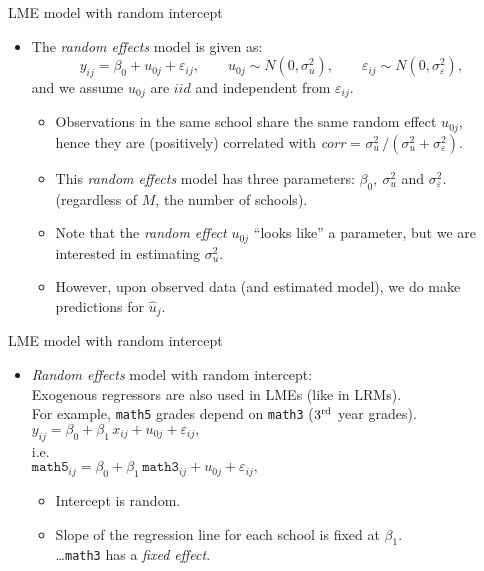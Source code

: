 \documentclass{beamer}
\begin{document}
\begin{frame}{LME model with random intercept}
\begin{itemize}
\item The \textit{random effects} model is given as:
$$ y_{ij} = \beta_{0} + u_{0j} + \varepsilon_{ij}, \qquad u_{0j} \sim N(0,\sigma^2_u), \qquad \varepsilon_{ij} \sim N(0,\sigma^2_{\varepsilon}), $$
and we assume $u_{0j}$ are $iid$ and independent from $\varepsilon_{ij}$.\\
\smallskip
\begin{itemize}
\item Observations in the same school share the same random effect $u_{0j}$,\\ hence they are (positively) correlated with \textit{corr} = $\sigma^2_u \, / (\sigma^2_u + \sigma^2_{\varepsilon})$.
\smallskip 
\item This \textit{random effects} model has three parameters: $\beta_{0},~ \sigma^2_u$ and $\sigma^2_{\varepsilon}$. (regardless of $M$, the number of schools).
\smallskip 
\item Note that the \textit{random effect} $u_{0j}$ ``looks like'' a parameter, but we are interested in estimating $\sigma^2_u$.
\smallskip 
\item However, upon observed data (and estimated model), we do make predictions for $\hat{u}_j$.
\end{itemize}
\end{itemize}
\end{frame}
\begin{frame}{LME model with random intercept}
\begin{itemize}
\item \textit{Random effects} model with random intercept:\\
\bigskip
Exogenous regressors are also used in LMEs (like in LRMs).\\
\smallskip
For example, \texttt{math5} grades depend on \texttt{math3} ($3{^{\textnormal{rd}}}$ year grades).\\
\medskip
$ y_{ij} = \beta_{0} + \beta_1 \, x_{ij} + u_{0j} + \varepsilon_{ij}, $\\
\medskip
i.e.\\
$ \texttt{math5}_{ij} = \beta_{0} + \beta_1 \, \texttt{math3}_{ij} + u_{0j} + \varepsilon_{ij}, $\\
\medskip
\begin{itemize}
\item Intercept is random.
\smallskip
\item Slope of the regression line for each school is fixed at $\beta_1$.\\
\dots \texttt{math3} has a \textit{fixed effect}.
\end{itemize}
\end{itemize}
\end{frame}
\end{document}

